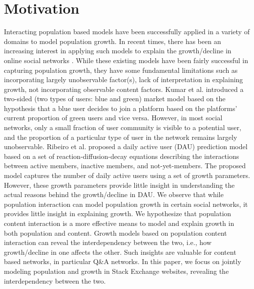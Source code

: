 \documentclass{sig-alternate-10pt}
\begin{document}
\section{Motivation}
Interacting population based models have been successfully applied in a variety of domains to model population growth. In recent times, there has been an increasing interest in applying such models to explain the growth/decline in online social networks \cite{Ribeiro2014,Kumar2010}. While these existing models have been fairly successful in capturing population growth, they have some fundamental limitations such as incorporating largely unobservable factor(s), lack of interpretation in explaining growth, not incorporating observable content factors. %
\newline
\newline
Kumar et al. \cite{Kumar2010} introduced a two-sided (two types of users: blue and green) market model based on the hypothesis that a blue user decides to join a platform based on the platforms' current proportion of green users and vice versa. However, in most social networks, only a small fraction of user community is visible to a potential user, and the proportion of a particular type of user in the network remains largely unobservable. 
\newline
\newline
Ribeiro et al. \cite{Ribeiro2014} proposed a daily active user (DAU) prediction model based on a set of reaction-diffusion-decay equations describing the interactions between active members, inactive members, and not-yet-members. The proposed model captures the number of daily active users using a set of growth parameters. However, these growth parameters provide little insight in understanding the actual reasons behind the growth/decline in DAU. 
\newline
\newline
We observe that while population interaction can model population growth in certain social networks, it provides little insight in explaining growth. We hypothesize that population content interaction is a more effective means to model and explain growth in both population and content. Growth models based on population content interaction can reveal the interdependency between the two, i.e., how growth/decline in one affects the other. Such insights are valuable for content based networks, in particular Q\&A networks. In this paper, we focus on jointly modeling population and growth in Stack Exchange websites, revealing the interdependency between the two.
\end{document}
